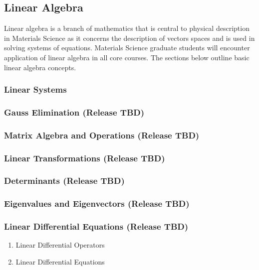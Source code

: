 \subsection{Linear Algebra}

Linear algebra is a branch of mathematics that is central to physical description in Materials Science as it concerns the description of vectors spaces and is used in solving systems of equations. Materials Science graduate students will encounter application of linear algebra in all core courses. The sections below outline basic linear algebra concepts. 

\subsubsection{Linear Systems}
\subsubsection{Gauss Elimination \hfill (Release TBD)}
\subsubsection{Matrix Algebra and Operations \hfill (Release TBD)}
\subsubsection{Linear Transformations \hfill (Release TBD)}
\subsubsection{Determinants \hfill (Release TBD)}
\subsubsection{Eigenvalues and Eigenvectors \hfill (Release TBD)}
\subsubsection{Linear Differential Equations \hfill (Release TBD)}
	\begin{enumerate}
		\item Linear Differential Operators
		\item Linear Differential Equations
	\end{enumerate}




